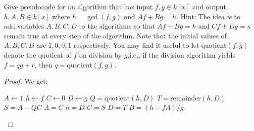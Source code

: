 \begin{exercise}{10}
Give pseudocode for an algorithm that has input $f,g\in k[x]$ and output $h,A,B\in k[x]$ where $h =\gcd(f,g)$ and $Af+Bg=h$. Hint: The idea is to add variables $A,B,C,D$ to the algorithms so that $Af+Bg =h$ and $Cf+Dg =s$ remain true at every step of the algorithm. Note that the initial values of $A,B,C,D$ are $1,0,0,1$ respectively. You may find it useful to let $\text{quotient}(f,g)$ denote the quotient of $f$ on division by $g$,i.e., if the division algorithm yields $f =qg+r$, then $q =\text{quotient}(f,g)$.
\end{exercise}
\begin{proof}
We get:
\begin{center}
\begin{algorithmic}
\STATE $A \gets 1$
\STATE $h \gets f$
\STATE $C \gets 0$
\STATE $D\gets g$
    \STATE $Q = \text{quotient}(h,D)$
    \STATE $T = \text{remainder}(h,D)$
    \STATE $S = A - QC$
    \STATE $A = C$
    \STATE $h = D$
    \STATE $C = S$
    \STATE $D = T$
\ENDWHILE
\STATE $B = (h - fA)/g$
\end{algorithmic}
\end{center}
\end{proof}

